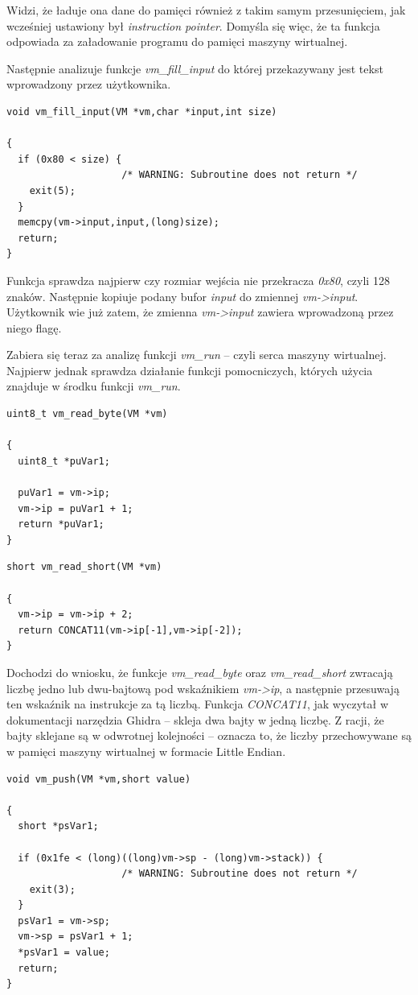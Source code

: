 \documentclass[language=polish,type=eng]{aghmodern}
\begin{document}
Widzi, że ładuje ona dane do pamięci również z takim samym przesunięciem, jak wcześniej
ustawiony był \emph{instruction pointer}. Domyśla się więc, że ta funkcja odpowiada za
załadowanie programu do pamięci maszyny wirtualnej.

Następnie analizuje funkcje \emph{vm\_fill\_input} do której przekazywany jest tekst
wprowadzony przez użytkownika.

\begin{verbatim}
void vm_fill_input(VM *vm,char *input,int size)

{
  if (0x80 < size) {
                    /* WARNING: Subroutine does not return */
    exit(5);
  }
  memcpy(vm->input,input,(long)size);
  return;
}
\end{verbatim}

Funkcja sprawdza najpierw czy rozmiar wejścia nie przekracza \emph{0x80}, czyli 128 znaków.
Następnie kopiuje podany bufor \emph{input} do zmiennej \emph{vm->input}.
Użytkownik wie już zatem, że zmienna \emph{vm->input} zawiera wprowadzoną przez niego flagę.

Zabiera się teraz za analizę funkcji \emph{vm\_run} -- czyli serca maszyny wirtualnej.
Najpierw jednak sprawdza działanie funkcji pomocniczych, których użycia znajduje w środku
funkcji \emph{vm\_run}.

\begin{verbatim}
uint8_t vm_read_byte(VM *vm)

{
  uint8_t *puVar1;
  
  puVar1 = vm->ip;
  vm->ip = puVar1 + 1;
  return *puVar1;
}
\end{verbatim}

\begin{verbatim}
short vm_read_short(VM *vm)

{
  vm->ip = vm->ip + 2;
  return CONCAT11(vm->ip[-1],vm->ip[-2]);
}
\end{verbatim}

Dochodzi do wniosku, że funkcje \emph{vm\_read\_byte} oraz \emph{vm\_read\_short}
zwracają liczbę jedno lub dwu-bajtową pod wskaźnikiem \emph{vm->ip},
a następnie przesuwają ten wskaźnik na instrukcje za tą liczbą.
Funkcja \emph{CONCAT11}, jak wyczytał w dokumentacji narzędzia Ghidra -- skleja
dwa bajty w jedną liczbę. Z racji, że bajty sklejane są w odwrotnej kolejności --
oznacza to, że liczby przechowywane są w pamięci maszyny wirtualnej w formacie Little Endian.

\begin{verbatim}
void vm_push(VM *vm,short value)

{
  short *psVar1;
  
  if (0x1fe < (long)((long)vm->sp - (long)vm->stack)) {
                    /* WARNING: Subroutine does not return */
    exit(3);
  }
  psVar1 = vm->sp;
  vm->sp = psVar1 + 1;
  *psVar1 = value;
  return;
}
\end{verbatim}
\end{document}
